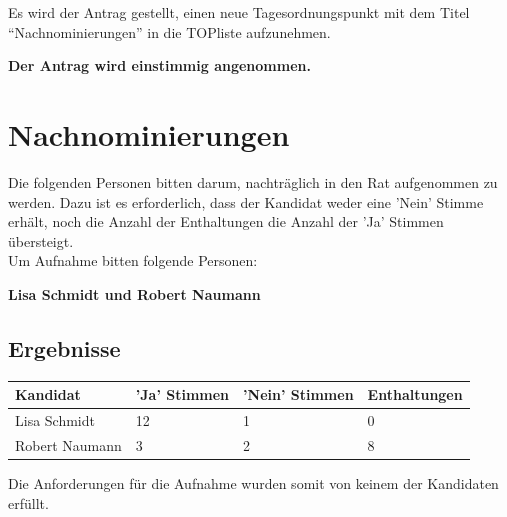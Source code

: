 \documentclass[a4paper, 11pt]{article} %
\begin{document}
\begin{flushleft}
Es wird der Antrag gestellt, einen neue Tagesordnungspunkt mit dem Titel "`Nachnominierungen"' in die TOPliste aufzunehmen.
\begin{center}
	\textbf{Der Antrag wird einstimmig angenommen.}
\end{center}
\end{flushleft}

\section{Nachnominierungen}
Die folgenden Personen bitten darum, nachträglich in den Rat aufgenommen zu werden. Dazu ist es erforderlich, dass der Kandidat weder eine 'Nein' Stimme erhält, noch die Anzahl der Enthaltungen die Anzahl der 'Ja' Stimmen übersteigt.\\
Um Aufnahme bitten folgende Personen:
\begin{flushleft}
	\textbf{Lisa Schmidt und Robert Naumann}
\end{flushleft}
\subsection{Ergebnisse}
\begin{tabular}{|l|l|l|l|}
	\hline
	\textbf{Kandidat} & \textbf{'Ja' Stimmen} & \textbf{'Nein' Stimmen} & \textbf{Enthaltungen}\\ \hline
	Lisa Schmidt & 12 & 1 & 0\\ \hline
	Robert Naumann & 3 & 2 & 8\\ \hline
\end{tabular}
\vspace{0.5cm}
\begin{flushleft}
	Die Anforderungen für die Aufnahme wurden somit von keinem der Kandidaten erfüllt.
\end{flushleft}
\end{document}
